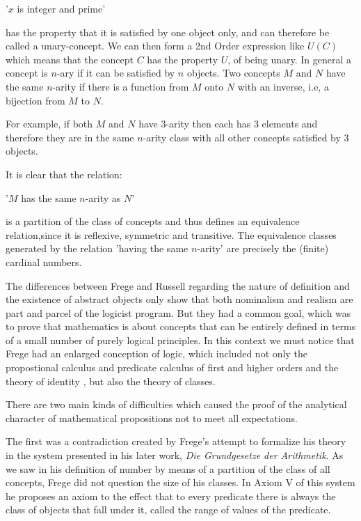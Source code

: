 \documentclass[12pt]{article}
\begin{document}
\begin{center}
'$x$ is integer and prime'
\end{center}

has the property that it is satisfied by one object only, and can therefore be called a unary-concept. We can then form a 2nd Order expression like $U (C)$ which means that the concept $C$ has the property $U$, of being unary. In general a concept is $n$-ary if it can be satisfied by $n$ objects. Two concepts $M$ and $N$ have the same $n$-arity if there is a function from $M$ onto $N$ with an inverse, i.e, a bijection from $M$ to $N$.

For example, if both $M$ and $N$ have 3-arity then each has 3 elements and therefore they are in the same $n$-arity class with all other concepts satisfied by 3 objects.

It is clear that the relation:

\begin{center}
'$M$ has the same $n$-arity as $N$'
\end{center}

is a partition of the class of concepts and thus defines an equivalence relation,since it is reflexive, symmetric and transitive. The equivalence classes generated by the relation 'having the same $n$-arity' are precisely the (finite) cardinal numbers.

The differences between Frege and Russell regarding the nature of definition and the existence of abstract objects only show that both nominalism and realism are part and parcel of the logicist program. But they had a common goal, which was to prove that mathematics is about concepts that can be entirely defined in terms of a small number of purely logical principles. In this context we must notice that  Frege had an enlarged conception of logic, which included not only the propostional calculus and predicate calculus of first and higher orders and the theory of identity , but also  the theory of classes.

There are two main kinds of difficulties which caused the proof of the analytical character of mathematical propositions not to meet all expectations.

The first was a contradiction created by Frege's attempt to formalize his theory in the system presented in his later work, \emph{Die Grundgesetze der Arithmetik}. As we saw in his definition of number by means of a partition of the class of all concepts, Frege did not question  the size of his classes. In  Axiom V of this system he proposes an axiom to the effect that to every predicate there is always the class of objects that fall under it, called  the range of values of the predicate. 
\end{document}
